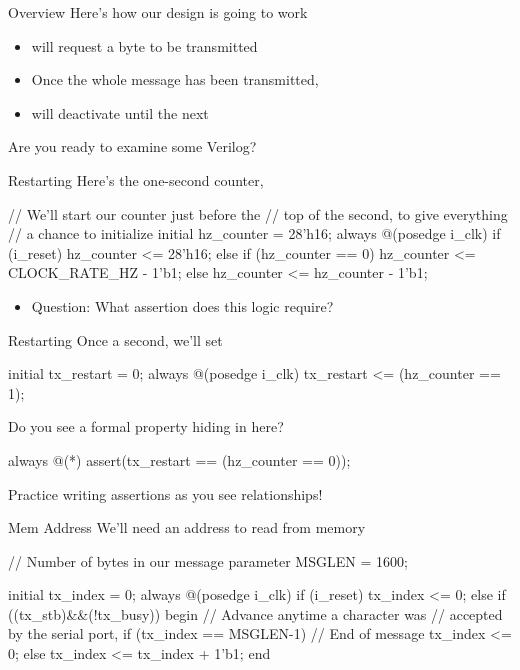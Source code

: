 \documentclass[style=gt,mode=present,paper=screen]{powerdot}
\begin{document}
%
%
\begin{slide}[toc=,bm=,method=direct]{Overview}
Here's how our design is going to work
\begin{center}
{\def\svgwidth{0.47\slidewidth}}
\end{center}
\begin{itemize}
\item {} will request a byte to be transmitted
\item Once the whole message has been transmitted,
\item {} will deactivate until the next 
\end{itemize}
Are you ready to examine some Verilog?
\end{slide}
%
%
\begin{slide}[method=file]{Restarting}
Here's the one-second counter, 
\begin{zformal}
// We'll start our counter just before the
// top of the second, to give everything
// a chance to initialize
initial	hz_counter = 28'h16;
always @(posedge i_clk)
if (i_reset)
        hz_counter <= 28'h16;
else if (hz_counter == 0)
        hz_counter <= CLOCK_RATE_HZ - 1'b1;
else
        hz_counter <= hz_counter - 1'b1;
\end{zformal}
\pause
\begin{itemize}
\item Question: What assertion does this logic require?
\end{itemize}
\end{slide}
%
%
\begin{slide}[toc=,bm=,method=direct]{Restarting}
Once a second, we'll set 
\begin{zformal}
initial	tx_restart = 0;
always @(posedge i_clk)
	tx_restart <= (hz_counter == 1);
\end{zformal}
Do you see a formal property hiding in here?
\begin{zformal}
always @(*)
	assert(tx_restart == (hz_counter == 0));
\end{zformal}
Practice writing assertions as you see relationships!
\end{slide}
%
%
\begin{slide}[method=direct]{Mem Address}
We'll need an address to read from memory
\begin{zformal}
// Number of bytes in our message
parameter	MSGLEN = 1600;

initial	tx_index = 0;
always @(posedge i_clk)
if (i_reset)
	tx_index <= 0;
else if ((tx_stb)&&(!tx_busy))
begin // Advance anytime a character was
	// accepted by the serial port,
	if (tx_index == MSGLEN-1)
		// End of message
		tx_index <= 0;
	else
		tx_index <= tx_index + 1'b1;
end
\end{zformal}
\end{slide}
\end{document}
